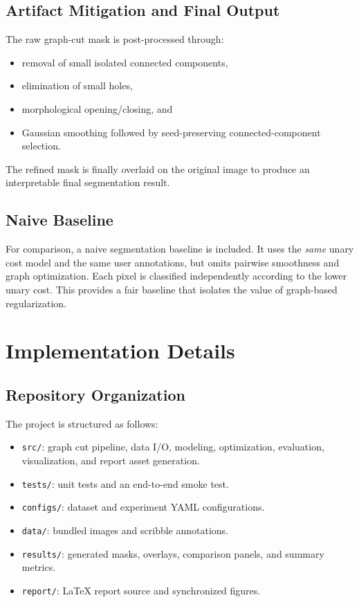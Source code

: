 \documentclass[conference]{IEEEtran}
\begin{document}
\subsection{Artifact Mitigation and Final Output}
The raw graph-cut mask is post-processed through:
\begin{itemize}
  \item removal of small isolated connected components,
  \item elimination of small holes,
  \item morphological opening/closing, and
  \item Gaussian smoothing followed by seed-preserving connected-component selection.
\end{itemize}
The refined mask is finally overlaid on the original image to produce an interpretable final segmentation result.

\subsection{Naive Baseline}
For comparison, a naive segmentation baseline is included. It uses the \emph{same} unary cost model and the same user annotations, but omits pairwise smoothness and graph optimization. Each pixel is classified independently according to the lower unary cost. This provides a fair baseline that isolates the value of graph-based regularization.

\section{Implementation Details}

\subsection{Repository Organization}
The project is structured as follows:
\begin{itemize}
  \item \texttt{src/}: graph cut pipeline, data I/O, modeling, optimization, evaluation, visualization, and report asset generation.
  \item \texttt{tests/}: unit tests and an end-to-end smoke test.
  \item \texttt{configs/}: dataset and experiment YAML configurations.
  \item \texttt{data/}: bundled images and scribble annotations.
  \item \texttt{results/}: generated masks, overlays, comparison panels, and summary metrics.
  \item \texttt{report/}: LaTeX report source and synchronized figures.
\end{itemize}
\end{document}
